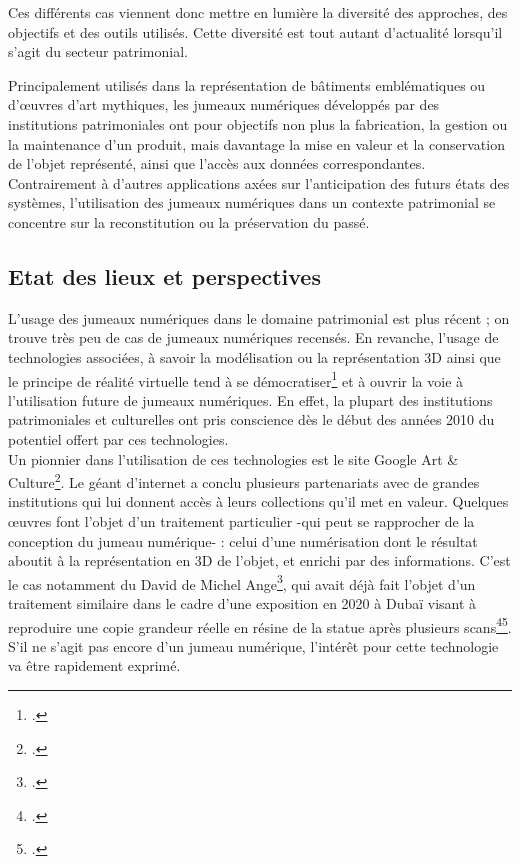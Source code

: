 Ces différents cas viennent donc mettre en lumière la diversité des approches, des objectifs et des outils utilisés. Cette diversité est tout autant d'actualité lorsqu'il s'agit du secteur patrimonial.


Principalement utilisés dans la représentation de bâtiments emblématiques ou d’œuvres d’art mythiques, les jumeaux numériques développés par des institutions patrimoniales ont pour objectifs non plus la fabrication, la gestion ou la maintenance d’un produit, mais davantage la mise en valeur et la conservation de l’objet représenté, ainsi que l’accès aux données correspondantes. Contrairement à d'autres applications axées sur l'anticipation des futurs états des systèmes, l'utilisation des jumeaux numériques dans un contexte patrimonial se concentre sur la reconstitution ou la préservation du passé. 

          \subsection{Etat des lieux et perspectives }

L’usage des jumeaux numériques dans le domaine patrimonial est plus récent ; on trouve très peu de cas de jumeaux numériques recensés. En revanche, l’usage de technologies associées, à savoir la modélisation ou  la représentation 3D ainsi que le principe de réalité virtuelle tend à se démocratiser\footcite{debideranVisitesNumeriquesParcours2014} et à ouvrir la voie à l'utilisation future de jumeaux numériques. En effet, la plupart des institutions patrimoniales et culturelles ont pris conscience dès le début des années 2010 du potentiel offert par ces technologies.\\

Un pionnier dans l'utilisation de ces technologies est le site Google Art \& Culture\footcite{ExplorerGoogleArts}. Le géant d'internet a conclu plusieurs partenariats avec de grandes institutions qui lui donnent accès à leurs collections qu'il met en valeur. Quelques œuvres font l'objet d'un traitement particulier -qui peut se rapprocher de la conception du jumeau numérique- : celui d'une numérisation dont le résultat aboutit à la représentation en 3D de l'objet, et enrichi par des informations. C'est le cas notamment du David de Michel Ange\footcite{MichelangeloDavid3D}, qui avait déjà fait l'objet d'un traitement similaire dans le cadre d'une exposition en 2020 à Dubaï visant à reproduire une copie grandeur réelle en résine de la statue après plusieurs scans\footcite{lydonMichelangeloDavidHas2021}\footcite{farooqiMichelangeloDavidHas2021}. S'il ne s'agit pas encore d'un jumeau numérique, l'intérêt pour cette technologie va être rapidement exprimé.\\ 
 
